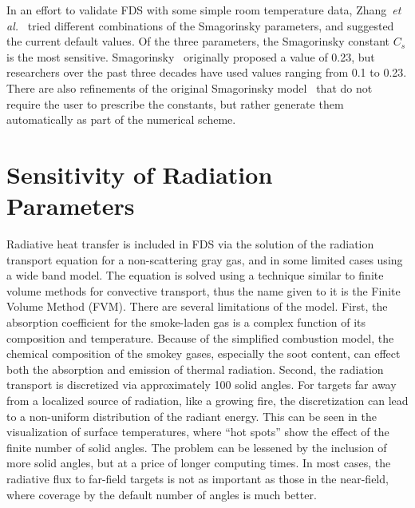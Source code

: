 \documentclass[11pt]{book}
\begin{document}
In an effort  to validate FDS with some  simple room temperature data,
Zhang~{\em et al.}~\cite{Zhang:2}  tried different combinations of the
Smagorinsky parameters,  and suggested the current  default values. Of
the  three parameters,  the  Smagorinsky constant  $C_s$  is the  most
sensitive.   Smagorinsky~\cite{Smagorinsky:1}  originally  proposed  a
value of 0.23,  but researchers over the past  three decades have used
values ranging  from 0.1  to 0.23. There  are also refinements  of the
original  Smagorinsky  model~\cite{Deardorff:1,Germano:1,Lilly:1} that
do  not  require the  user  to  prescribe  the constants,  but  rather
generate them automatically as part of the numerical scheme.

\section{Sensitivity of Radiation Parameters}

Radiative heat  transfer is  included in FDS  via the solution  of the
radiation  transport equation for  a non-scattering  gray gas,  and in
some limited  cases using  a wide band  model. The equation  is solved
using  a technique  similar to  finite volume  methods  for convective
transport,  thus the  name given  to it  is the  Finite  Volume Method
(FVM).  There  are  several  limitations  of  the  model.  First,  the
absorption coefficient  for the smoke-laden gas is  a complex function
of  its  composition  and   temperature.  Because  of  the  simplified
combustion  model,  the  chemical  composition of  the  smokey  gases,
especially  the  soot content,  can  effect  both  the absorption  and
emission  of thermal  radiation.  Second, the  radiation transport  is
discretized via  approximately 100 solid angles. For  targets far away
from  a  localized source  of  radiation,  like  a growing  fire,  the
discretization can  lead to a non-uniform distribution  of the radiant
energy. This can be seen in the visualization of surface temperatures,
where  ``hot spots'' show  the effect  of the  finite number  of solid
angles. The  problem can  be lessened by  the inclusion of  more solid
angles, but at  a price of longer computing times.  In most cases, the
radiative flux  to far-field targets is  not as important  as those in
the near-field, where coverage by the default number of angles is much
better.
\end{document}

